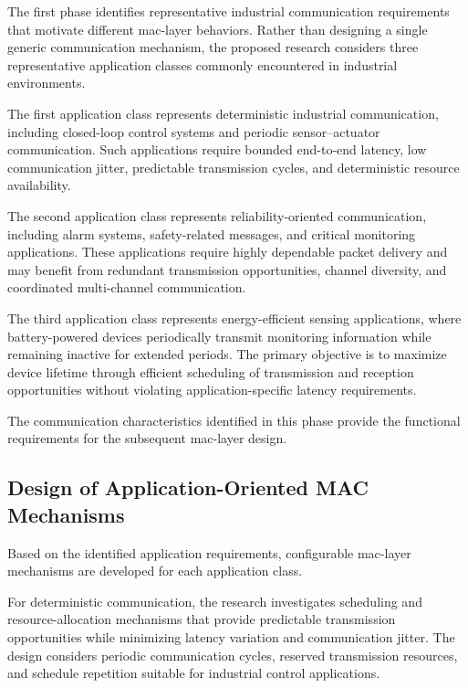 \documentclass[12pt,a4paper]{article}
\begin{document}
The first phase identifies representative industrial communication requirements that motivate different \gls{mac}-layer behaviors. Rather than designing a single generic communication mechanism, the proposed research considers three representative application classes commonly encountered in industrial environments.

The first application class represents deterministic industrial communication, including closed-loop control systems and periodic sensor--actuator communication. Such applications require bounded end-to-end latency, low communication jitter, predictable transmission cycles, and deterministic resource availability.

The second application class represents reliability-oriented communication, including alarm systems, safety-related messages, and critical monitoring applications. These applications require highly dependable packet delivery and may benefit from redundant transmission opportunities, channel diversity, and coordinated multi-channel communication.

The third application class represents energy-efficient sensing applications, where battery-powered devices periodically transmit monitoring information while remaining inactive for extended periods. The primary objective is to maximize device lifetime through efficient scheduling of transmission and reception opportunities without violating application-specific latency requirements.

The communication characteristics identified in this phase provide the functional requirements for the subsequent \gls{mac}-layer design.


\subsection{Design of Application-Oriented MAC Mechanisms}

Based on the identified application requirements, configurable \gls{mac}-layer mechanisms are developed for each application class.

For deterministic communication, the research investigates scheduling and resource-allocation mechanisms that provide predictable transmission opportunities while minimizing latency variation and communication jitter. The design considers periodic communication cycles, reserved transmission resources, and schedule repetition suitable for industrial control applications.
\end{document}
